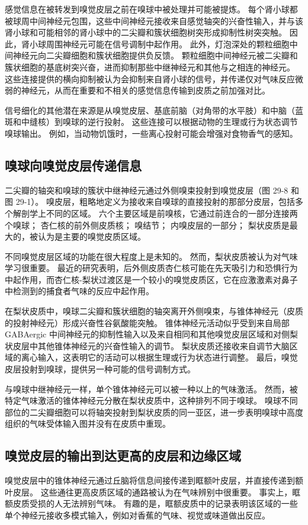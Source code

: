 感觉信息在被转发到嗅觉皮层之前在嗅球中被处理并可能被提炼。 每个肾小球都被球周中间神经元包围，这些中间神经元接收来自感觉轴突的兴奋性输入，并与该肾小球和可能相邻的肾小球中的二尖瓣和簇状细胞树突形成抑制性树突突触。 因此，肾小球周围神经元可能在信号调制中起作用。 此外，灯泡深处的颗粒细胞中间神经元向二尖瓣细胞和簇状细胞提供负反馈。 颗粒细胞中间神经元被二尖瓣和簇状细胞的基底树突兴奋，进而抑制那些中继神经元和其他与之相连的神经元。 这些连接提供的横向抑制被认为会抑制来自肾小球的信号，并传递仅对气味反应微弱的神经元，从而在重要和不相关的感觉信息传输到皮质之前加强对比。

信号细化的其他潜在来源是从嗅觉皮层、基底前脑（对角带的水平肢）和中脑（蓝斑和中缝核）到嗅球的逆行投射。 这些连接可以根据动物的生理或行为状态调节嗅球输出。 例如，当动物饥饿时，一些离心投射可能会增强对食物香气的感知。

\subsection{嗅球向嗅觉皮层传递信息}
二尖瓣的轴突和嗅球的簇状中继神经元通过外侧嗅束投射到嗅觉皮层（图 29-8 和图 29-1）。 嗅皮层，粗略地定义为接收来自嗅球的直接投射的那部分皮层，包括多个解剖学上不同的区域。 六个主要区域是前嗅核，它通过前连合的一部分连接两个嗅球； 杏仁核的前外侧皮质核； 嗅结节； 内嗅皮层的一部分； 梨状皮质是最大的，被认为是主要的嗅觉皮质区域。

不同嗅觉皮层区域的功能在很大程度上是未知的。 然而，梨状皮质被认为对气味学习很重要。 最近的研究表明，后外侧皮质杏仁核可能在先天吸引力和恐惧行为中起作用，而杏仁核-梨状过渡区是一个较小的嗅觉皮质区，它在应激激素对鼻子中检测到的捕食者气味的反应中起作用。

在梨状皮质中，嗅球二尖瓣和簇状细胞的轴突离开外侧嗅束，与锥体神经元（皮质的投射神经元）形成兴奋性谷氨酸能突触。 锥体神经元活动似乎受到来自局部 GABAergic 中间神经元的抑制性输入以及来自相同和其他嗅觉皮层区域和对侧梨状皮层中其他锥体神经元的兴奋性输入的调节。 梨状皮质还接收来自调节大脑区域的离心输入，这表明它的活动可以根据生理或行为状态进行调整。 最后，嗅觉皮层投射到嗅球，提供另一种可能的信号调制方式。

与嗅球中继神经元一样，单个锥体神经元可以被一种以上的气味激活。 然而，被特定气味激活的锥体神经元分散在梨状皮质中，这种排列不同于嗅球。 嗅球不同部位的二尖瓣细胞可以将轴突投射到梨状皮质的同一亚区，进一步表明嗅球中高度组织的气味受体输入图并没有在皮质中重现。

\subsection{嗅觉皮层的输出到达更高的皮层和边缘区域}
嗅觉皮层中的锥体神经元通过丘脑将信息间接传递到眶额叶皮层，并直接传递到额叶皮层。 这些通往更高皮质区域的通路被认为在气味辨别中很重要。 事实上，眶额皮质受损的人无法辨别气味。 有趣的是，眶额皮质中的记录表明该区域的一些单个神经元接收多模式输入，例如对香蕉的气味、视觉或味道做出反应。

